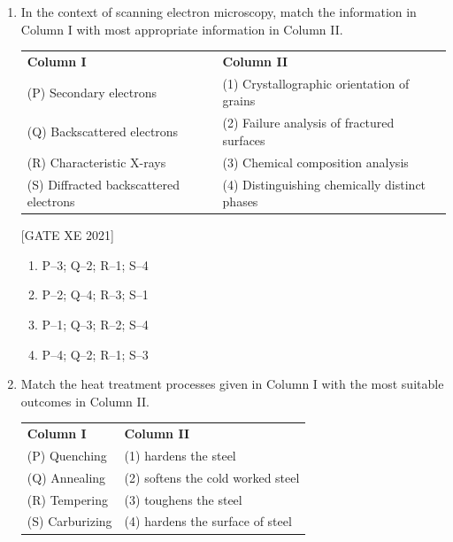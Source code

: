 \documentclass[journal,12pt,onecolumn]{IEEEtran}
\theoremstyle{remark}
\begin{document}
\begin{enumerate}[resume]

\item In the context of scanning electron microscopy, match the information in Column I with most appropriate information in Column II. 

\begin{center}
\begin{tabular}{p{6cm} p{6cm}}
\textbf{Column I} & \textbf{Column II} \\
(P) Secondary electrons & (1) Crystallographic orientation of grains \\
(Q) Backscattered electrons & (2) Failure analysis of fractured surfaces \\
(R) Characteristic X-rays & (3) Chemical composition analysis \\
(S) Diffracted backscattered electrons & (4) Distinguishing chemically distinct phases \\
\end{tabular}
\end{center}

\hfill[GATE XE 2021]

\begin{multicols}{2}
\begin{enumerate}
\item P–3; Q–2; R–1; S–4
\item P–2; Q–4; R–3; S–1
\item P–1; Q–3; R–2; S–4
\item P–4; Q–2; R–1; S–3
\end{enumerate}
\end{multicols}



\item Match the heat treatment processes given in Column I with the most suitable outcomes in Column II. 

\begin{center}
\begin{tabular}{p{6cm} p{6cm}}
\textbf{Column I} & \textbf{Column II} \\
(P) Quenching & (1) hardens the steel \\
(Q) Annealing & (2) softens the cold worked steel \\
(R) Tempering & (3) toughens the steel \\
(S) Carburizing & (4) hardens the surface of steel \\
\end{tabular}
\end{center}


\end{enumerate}
\end{document}
